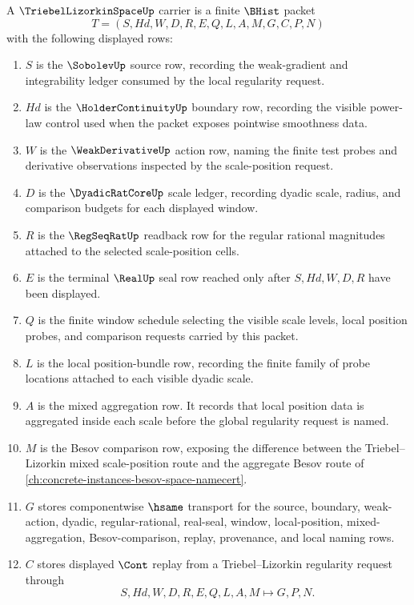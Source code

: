 \begin{definition}
\label{def:triebel-lizorkin-space-carrier}
A $\TriebelLizorkinSpaceUp$ carrier is a finite $\BHist$ packet
$$
T=(S,Hd,W,D,R,E,Q,L,A,M,G,C,P,N)
$$
with the following displayed rows:
\begin{enumerate}
\item $S$ is the $\SobolevUp$ source row, recording the weak-gradient and integrability ledger consumed by the local regularity request.
\item $Hd$ is the $\HolderContinuityUp$ boundary row, recording the visible power-law control used when the packet exposes pointwise smoothness data.
\item $W$ is the $\WeakDerivativeUp$ action row, naming the finite test probes and derivative observations inspected by the scale-position request.
\item $D$ is the $\DyadicRatCoreUp$ scale ledger, recording dyadic scale, radius, and comparison budgets for each displayed window.
\item $R$ is the $\RegSeqRatUp$ readback row for the regular rational magnitudes attached to the selected scale-position cells.
\item $E$ is the terminal $\RealUp$ seal row reached only after $S,Hd,W,D,R$ have been displayed.
\item $Q$ is the finite window schedule selecting the visible scale levels, local position probes, and comparison requests carried by this packet.
\item $L$ is the local position-bundle row, recording the finite family of probe locations attached to each visible dyadic scale.
\item $A$ is the mixed aggregation row. It records that local position data is aggregated inside each scale before the global regularity request is named.
\item $M$ is the Besov comparison row, exposing the difference between the Triebel--Lizorkin mixed scale-position route and the aggregate Besov route of \autoref{ch:concrete-instances-besov-space-namecert}.
\item $G$ stores componentwise $\hsame$ transport for the source, boundary, weak-action, dyadic, regular-rational, real-seal, window, local-position, mixed-aggregation, Besov-comparison, replay, provenance, and local naming rows.
\item $C$ stores displayed $\Cont$ replay from a Triebel--Lizorkin regularity request through
$$
S,Hd,W,D,R,E,Q,L,A,M \longmapsto G,P,N .
$$
\end{enumerate}
\end{definition}
